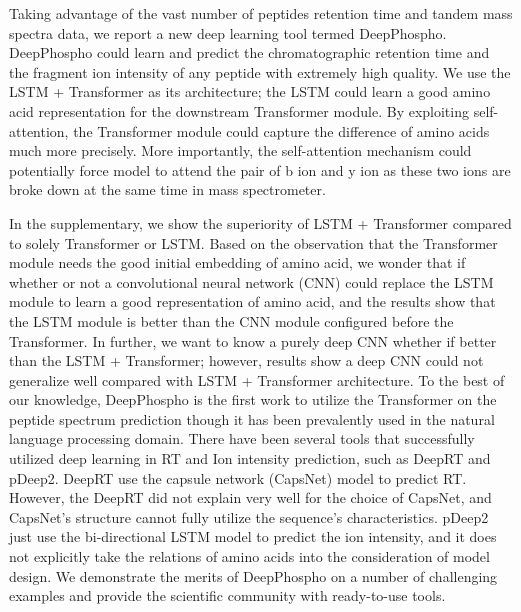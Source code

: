 Taking advantage of the vast number of peptides retention time and tandem mass spectra data,
we report a new deep learning tool termed DeepPhospho. DeepPhospho could learn and predict the chromatographic retention time and the fragment ion intensity of any peptide with extremely high quality. 
We use the LSTM + Transformer as its architecture; the LSTM could learn a good amino acid representation for the downstream Transformer module. By exploiting self-attention, the Transformer module could capture the difference of amino acids much more precisely. More importantly, the self-attention mechanism could potentially force model to attend the pair of b ion and y ion as these two ions are broke down at the same time in mass spectrometer.

In the supplementary, we show the superiority of LSTM + 
Transformer compared to solely Transformer or LSTM. Based on the observation that the Transformer module needs 
the good initial embedding of amino acid, we wonder that if whether or not a convolutional neural network (CNN) 
could replace the LSTM module to learn a good representation of amino acid, and the results show that the LSTM module is better than the CNN module configured before the Transformer. In further, we want to know a purely deep CNN whether if better than the LSTM + Transformer; however, results show a deep CNN could not generalize well compared with LSTM + Transformer architecture. 
To the best of our knowledge, DeepPhospho is the first work to utilize the Transformer on the peptide spectrum prediction
though it has been prevalently used in the natural language processing domain.
There have been several tools that successfully utilized deep learning in RT and Ion intensity prediction, such as DeepRT\cite{ma2018improved} and pDeep2\cite{zeng2019ms}.
DeepRT use the capsule network (CapsNet) \cite{sabour2017dynamic} 
model to predict RT. However, the DeepRT did not explain very well for the choice of CapsNet, and CapsNet's structure cannot fully utilize the sequence's characteristics. 
pDeep2 just use the bi-directional LSTM model to predict the ion intensity, and it does not explicitly take the relations of amino acids into the consideration of model design.
We demonstrate the merits of DeepPhospho on a number of challenging examples and provide the scientific community 
with ready-to-use tools.